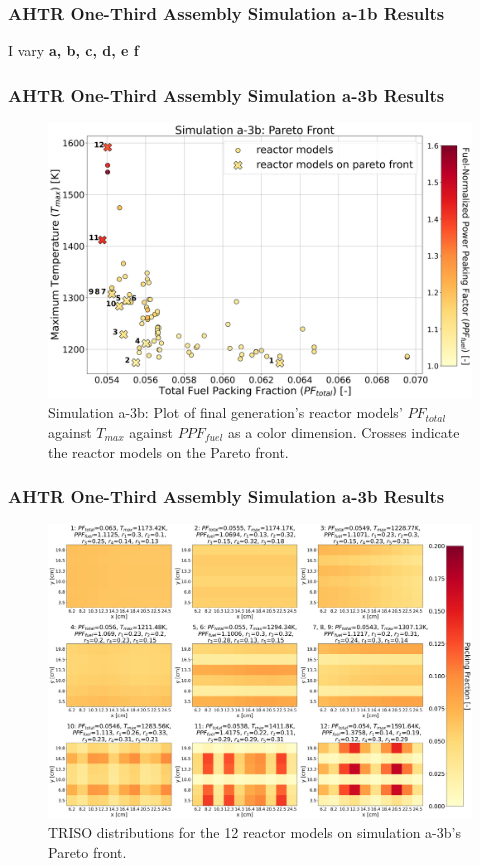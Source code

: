 \begin{frame}
    \frametitle{AHTR One-Third Assembly Simulation a-1b Results}
    I vary \textbf{a, b, c, d, e f} 
\end{frame}


\begin{frame}
    \frametitle{AHTR One-Third Assembly Simulation a-3b Results}
    \begin{figure}
        \includegraphics[width=0.8\linewidth]{../docs/figures/assem-obj-3-all-2d.png} 
        \caption{Simulation a-3b: Plot of final generation's reactor models' 
        $PF_{total}$ against $T_{max}$ against $PPF_{fuel}$ as a color dimension. 
        Crosses indicate the reactor models on the Pareto front.}
    \end{figure}
\end{frame}

\begin{frame}
    \frametitle{AHTR One-Third Assembly Simulation a-3b Results}
    \begin{figure}
        \includegraphics[width=0.8\linewidth]{../docs/figures/assem-obj-3-all-distr.png} 
        \caption{TRISO distributions for the 12 reactor models on simulation 
        a-3b's Pareto front.}
    \end{figure}
\end{frame}

